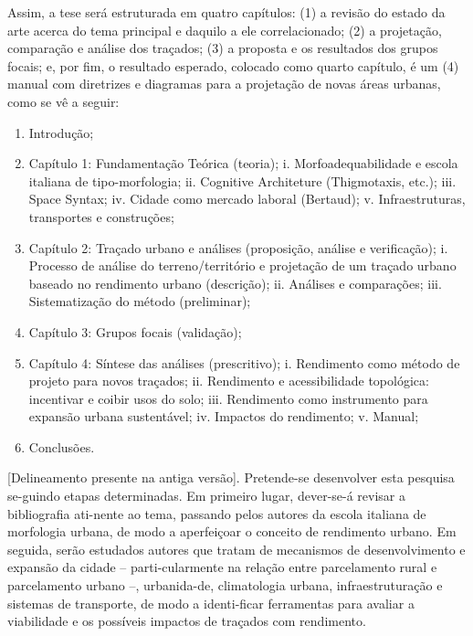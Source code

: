 \documentclass[twoside, 12pt]{book}
\begin{document}
\begin{enumerate}[label=\alph*)]
        Assim, a tese será estruturada em quatro capítulos: (1) a revisão do estado da arte acerca do tema principal e daquilo a ele correlacionado; (2) a projetação, comparação e análise dos traçados; (3) a proposta e os resultados dos grupos focais; e, por fim, o resultado esperado, colocado como quarto capítulo, é um (4) manual com diretrizes e diagramas para a projetação de novas áreas urbanas, como se vê a seguir:
        \begin{enumerate}
            \item	Introdução;
            \item	Capítulo 1: Fundamentação Teórica (teoria);
                \subitem i.	Morfoadequabilidade e escola italiana de tipo-morfologia;
                \subitem ii.	Cognitive Architeture (Thigmotaxis, etc.);
                \subitem iii.	Space Syntax; 
                \subitem iv.	Cidade como mercado laboral (Bertaud);
                \subitem v.	Infraestruturas, transportes e construções;
            \item	Capítulo 2: Traçado urbano e análises (proposição, análise e verificação);
                \subitem i.	Processo de análise do terreno/território e projetação de um traçado urbano baseado no rendimento urbano (descrição);
                \subitem ii.	Análises e comparações;
                \subitem iii.	Sistematização do método (preliminar);
            \item Capítulo 3: Grupos focais (validação);
            \item Capítulo 4: Síntese das análises (prescritivo);
                \subitem i.	Rendimento como método de projeto para novos traçados;
                \subitem ii.	Rendimento e acessibilidade topológica: incentivar e coibir usos do solo;
                \subitem iii.	Rendimento como instrumento para expansão urbana sustentável;
                \subitem iv.	Impactos do rendimento;
                \subitem v.	Manual;
            \item Conclusões.
        \end{enumerate}

        [Delineamento presente na antiga versão]. Pretende-se desenvolver esta pesquisa se-guindo etapas determinadas. Em primeiro lugar, dever-se-á revisar a bibliografia ati-nente ao tema, passando pelos autores da escola italiana de morfologia urbana, de modo a aperfeiçoar o conceito de rendimento urbano. Em seguida, serão estudados autores que tratam de mecanismos de desenvolvimento e expansão da cidade – parti-cularmente na relação entre parcelamento rural e parcelamento urbano –, urbanida-de, climatologia urbana, infraestruturação e sistemas de transporte, de modo a identi-ficar ferramentas para avaliar a viabilidade e os possíveis impactos de traçados com rendimento.


\end{enumerate}
\end{document}
